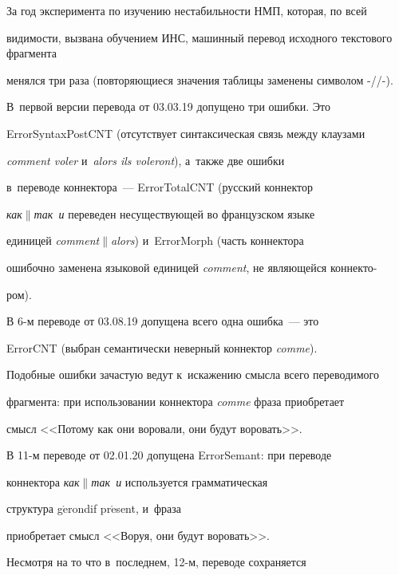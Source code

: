 




  За год эксперимента по изучению нестабильности НМП, которая, по всей 


видимости, вызвана обучением ИНС, машинный перевод исходного текстового фрагмента 


менялся три раза (повторяющиеся значения таблицы заменены символом -/\!\!/-). 


В~первой версии перевода от 03.03.19 допущено три ошибки. Это 


\mbox{ErrorSyntaxPostCNT} (отсутствует синтаксическая связь между клаузами 


\textit{comment voler} и~\textit{alors ils voleront}), а~также две ошибки 


в~переводе коннектора~--- ErrorTotalCNT (русский коннектор 


\textit{как}$\|$\textit{так~и} переведен несуществующей во французском языке 


единицей \textit{comment}$\|$\textit{alors}) и~ErrorMorph (часть коннектора 


ошибочно заменена языковой единицей \textit{comment}, не являющейся коннекто-\linebreak


ром). 


  


  В 6-м переводе от 03.08.19 допущена всего одна ошибка~--- это 


ErrorCNT (выбран семантически неверный коннектор \textit{comme}). 


Подобные ошибки зачастую ведут к~искажению смысла всего переводимого 


фрагмента: при использовании коннектора \textit{comme} фраза приобретает 


смысл <<Потому как они воровали, они будут воровать>>. 


  


  В 11-м переводе от 02.01.20 допущена ErrorSemant: при переводе 


коннектора \textit{как}$\|$\textit{так~и} используется грамматическая 


структура g$\acute{\mbox{e}}$rondif pr$\acute{\mbox{e}}$sent, и~фраза 


приобретает смысл <<Воруя, они будут воровать>>.


  


  Несмотря на то что в~последнем, 12-м, переводе сохраняется 


